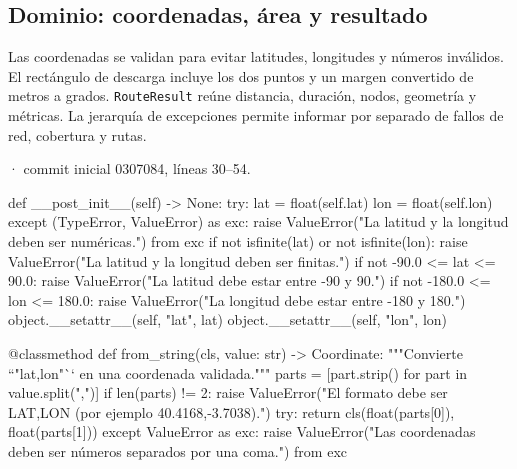 \documentclass[11pt,a4paper]{article}
\begin{document}
\subsection{Dominio: coordenadas, área y resultado}
Las coordenadas se validan para evitar latitudes, longitudes y números inválidos. El rectángulo de descarga incluye los dos puntos y un margen convertido de metros a grados. \texttt{RouteResult} reúne distancia, duración, nodos, geometría y métricas. La jerarquía de excepciones permite informar por separado de fallos de red, cobertura y rutas.

\smallskip
{\footnotesize\texttt{} · commit inicial 0307084, líneas 30--54.}\par
\begin{Codigo}[firstnumber=30]
    def __post_init__(self) -> None:
        try:
            lat = float(self.lat)
            lon = float(self.lon)
        except (TypeError, ValueError) as exc:
            raise ValueError("La latitud y la longitud deben ser numéricas.") from exc
        if not isfinite(lat) or not isfinite(lon):
            raise ValueError("La latitud y la longitud deben ser finitas.")
        if not -90.0 <= lat <= 90.0:
            raise ValueError("La latitud debe estar entre -90 y 90.")
        if not -180.0 <= lon <= 180.0:
            raise ValueError("La longitud debe estar entre -180 y 180.")
        object.__setattr__(self, "lat", lat)
        object.__setattr__(self, "lon", lon)

    @classmethod
    def from_string(cls, value: str) -> Coordinate:
        """Convierte ``"lat,lon"`` en una coordenada validada."""
        parts = [part.strip() for part in value.split(",")]
        if len(parts) != 2:
            raise ValueError("El formato debe ser LAT,LON (por ejemplo 40.4168,-3.7038).")
        try:
            return cls(float(parts[0]), float(parts[1]))
        except ValueError as exc:
            raise ValueError("Las coordenadas deben ser números separados por una coma.") from exc
\end{Codigo}
\end{document}

